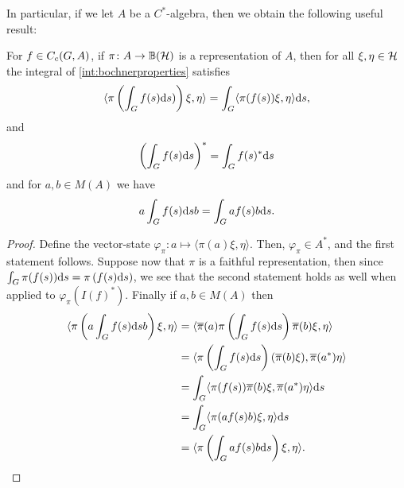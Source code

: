 In particular, if we let $A$ be a $C^*$-algebra, then we obtain the following useful result:
\begin{proposition}
	For $f \in C_c(G,A)$, if $\pi \colon A \to \mathbb{B}(\mathcal{H})$ is a representation of $A$, then for all $\xi , \eta \in \mathcal{H}$ the integral of \ref{int:bochnerproperties} satisfies
	\begin{align*}
		\langle \pi\left( \int_G f(s) \mathrm{d} s ) \right) \xi , \eta \rangle = \int_{G} \langle \pi(f(s)) \xi , \eta \rangle \mathrm{d} s,
	\end{align*}
	and 
	\begin{align*}
		\left( \int_G f(s) \mathrm{d} s  \right)^* = \int_G f(s)^* \mathrm{d} s
	\end{align*}
	and for $a , b \in M(A)$ we have
	\begin{align*}
	 a \int_G f(s) \mathrm{d} s b = \int_G a f(s) b \mathrm{d} s.		
	\end{align*}
	\label{int:cstarint}
\end{proposition}
\begin{proof}
	Define the vector-state $\varphi_\pi \colon a \mapsto \langle \pi(a) \xi , \eta \rangle$. Then, $\varphi_\pi \in A^*$, and the first statement follows. Suppose now that $\pi$ is a faithful representation, then since $\int_G \pi(f(s)) \mathrm{d} s = \pi \left( f(s) \mathrm{d} s \right)$, we see that the second statement holds as well when applied to $\varphi_\pi(I(f)^*)$. Finally if $a,b \in M(A)$ then
	\begin{align*}
		\langle \pi\left(a \int_G f(s) \mathrm{d} s b \right) \xi , \eta \rangle &= \langle \overline \pi(a) \pi\left( \int_G f(s) \mathrm{d} s \right) \overline \pi (b)  \xi , \eta \rangle \\
		 &= \langle \pi \left( \int_G f(s) \mathrm{d} s \right) (\overline \pi (b) \xi ) , \overline \pi(a^*) \eta \rangle \\ 
		 &= \int_G \langle \pi(f(s)) \overline \pi (b) \xi , \overline \pi(a ^* ) \eta \rangle \mathrm{d} s\\
		 &= \int_G \langle \pi(af(s)b) \xi , \eta \rangle \mathrm{d} s\\
		 &= \langle \pi \left(  \int_G a f(s) b \mathrm{d} s  \right) \xi , \eta \rangle.
	\end{align*}
\end{proof}

